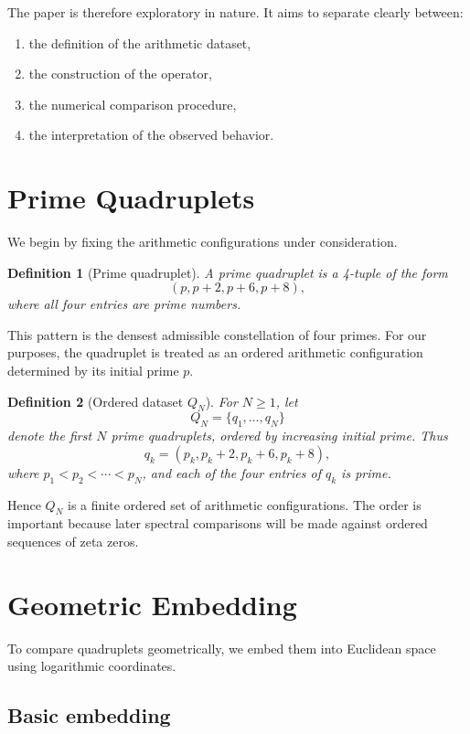 \documentclass[11pt,a4paper]{article}
\newtheorem{definition}{Definition}[section]
\begin{document}
	The paper is therefore exploratory in nature. It aims to separate clearly between:
	\begin{enumerate}[label=(\roman*)]
		\item the definition of the arithmetic dataset,
		\item the construction of the operator,
		\item the numerical comparison procedure,
		\item the interpretation of the observed behavior.
	\end{enumerate}
	
	\section{Prime Quadruplets}
	
	We begin by fixing the arithmetic configurations under consideration.
	
	\begin{definition}[Prime quadruplet]
		A prime quadruplet is a 4-tuple of the form
		\[
		(p,p+2,p+6,p+8),
		\]
		where all four entries are prime numbers.
	\end{definition}
	
	This pattern is the densest admissible constellation of four primes. For our purposes, the quadruplet is treated as an ordered arithmetic configuration determined by its initial prime \(p\).
	
	\begin{definition}[Ordered dataset \(Q_N\)]
		For \(N\geq 1\), let
		\[
		Q_N = \{q_1,\dots,q_N\}
		\]
		denote the first \(N\) prime quadruplets, ordered by increasing initial prime. Thus
		\[
		q_k = (p_k,p_k+2,p_k+6,p_k+8),
		\]
		where \(p_1 < p_2 < \cdots < p_N\), and each of the four entries of \(q_k\) is prime.
	\end{definition}
	
	Hence \(Q_N\) is a finite ordered set of arithmetic configurations. The order is important because later spectral comparisons will be made against ordered sequences of zeta zeros.
	
	\section{Geometric Embedding}
	
	To compare quadruplets geometrically, we embed them into Euclidean space using logarithmic coordinates.
	
	\subsection{Basic embedding}
	
\end{document}
